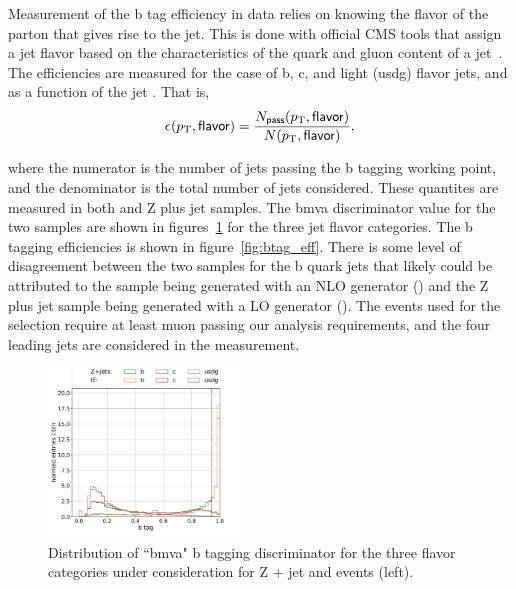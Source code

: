 Measurement of the b tag efficiency in data relies on knowing the flavor
of the parton that gives rise to the jet.  This is done with official
CMS tools that assign a jet flavor based on the characteristics of the
quark and gluon content of a jet~\cite{twiki:jet_mc_flavor}.  The
efficiencies are measured for the case of b, c, and light (usdg) flavor
jets, and as a function of the jet \pt.  That is,
\begin{equation}
    \epsilon_{}(p_{\mathrm{T}}, \mathsf{flavor}) = \frac{N_{\sf pass}(p_{\mathrm{T}}, \sf
    flavor)}{N(p_{\mathrm{T}}, \sf flavor)},
\end{equation}

where the numerator is the number of jets passing the b tagging working
point, and the denominator is the total number of jets considered.
These quantites are measured in both \ttbar and Z plus jet samples.  The
bmva discriminator value for the two samples are shown in
figures~\ref{fig:btag_bmva} for the three jet flavor categories.  The b
tagging efficiencies is shown in figure~\ref{fig:btag_eff}.  There is
some level of disagreement between the two samples for the b quark jets
that likely could be attributed to the \ttbar sample being generated
with an NLO generator (\POWHEG) and the Z plus jet sample being
generated with a LO generator (\MADGRAPH).  The events used for the
selection require at least muon passing our analysis requirements, and
the four leading \pt jets are considered in the measurement.  

\begin{figure}[h!]
    \centering
    \includegraphics[width=0.45\textwidth]{chapters/Appendix/sectionBtag/figures/bmva_mc.pdf}
    \caption{Distribution of ``bmva" b tagging discriminator for the
    three flavor categories under consideration for Z + jet and
    \ttbar events (left).      
    \label{fig:btag_bmva}}
\end{figure}

